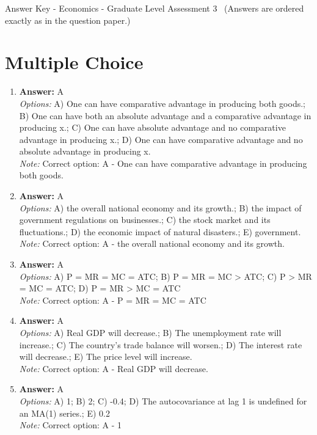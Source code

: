 \documentclass[12pt]{article}
\begin{document}
\begin{center}
Answer Key - Economics - Graduate Level Assessment 3 \
\small (Answers are ordered exactly as in the question paper.)
\end{center}

\section*{Multiple Choice}
\begin{enumerate}[label=\arabic*.]
\item \textbf{Answer:} A
\\ \textit{Options:} A) One can have comparative advantage in producing both goods.; B) One can have both an absolute advantage and a comparative advantage in producing x.; C) One can have absolute advantage and no comparative advantage in producing x.; D) One can have comparative advantage and no absolute advantage in producing x.
\\ \textit{Note:} Correct option: A - One can have comparative advantage in producing both goods.
\item \textbf{Answer:} A
\\ \textit{Options:} A) the overall national economy and its growth.; B) the impact of government regulations on businesses.; C) the stock market and its fluctuations.; D) the economic impact of natural disasters.; E) government.
\\ \textit{Note:} Correct option: A - the overall national economy and its growth.
\item \textbf{Answer:} A
\\ \textit{Options:} A) P = MR = MC = ATC; B) P = MR = MC \textgreater{} ATC; C) P \textgreater{} MR = MC = ATC; D) P = MR \textgreater{} MC = ATC
\\ \textit{Note:} Correct option: A - P = MR = MC = ATC
\item \textbf{Answer:} A
\\ \textit{Options:} A) Real GDP will decrease.; B) The unemployment rate will increase.; C) The country's trade balance will worsen.; D) The interest rate will decrease.; E) The price level will increase.
\\ \textit{Note:} Correct option: A - Real GDP will decrease.
\item \textbf{Answer:} A
\\ \textit{Options:} A) 1; B) 2; C) -0.4; D) The autocovariance at lag 1 is undefined for an MA(1) series.; E) 0.2
\\ \textit{Note:} Correct option: A - 1
\end{enumerate}
\end{document}
